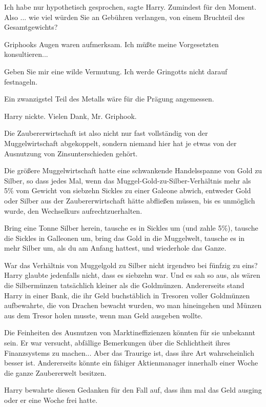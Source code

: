 \glqq Ich habe nur hypothetisch gesprochen\grqq{}, sagte Harry. Zumindest für
den Moment. \glqq Also ... wie viel würden Sie an Gebühren verlangen, von einem
Bruchteil des Gesamtgewichts?\grqq{}

Griphooks Augen waren aufmerksam. \glqq Ich müßte meine Vorgesetzten
konsultieren...\grqq{}

\glqq Geben Sie mir eine wilde Vermutung. Ich werde Gringotts nicht darauf
festnageln.\grqq{}

\glqq Ein zwanzigstel Teil des Metalls wäre für die Prägung angemessen.\grqq{}

Harry nickte. \glqq Vielen Dank, Mr. Griphook.\grqq{}

Die Zaubererwirtschaft ist also nicht nur fast vollständig von der
Muggelwirtschaft abgekoppelt, sondern niemand hier hat je etwas von der
Ausnutzung von Zinsunterschieden gehört.

Die größere Muggelwirtschaft hatte eine schwankende Handelsspanne von Gold zu
Silber, so dass jedes Mal, wenn das Muggel-Gold-zu-Silber-Verhältnis mehr als
5\% vom Gewicht von siebzehn Sickles zu einer Galeone abwich, entweder Gold oder
Silber aus der Zaubererwirtschaft hätte abfließen müssen, bis es unmöglich
wurde, den Wechselkurs aufrechtzuerhalten.

Bring eine Tonne Silber herein, tausche es in Sickles um (und zahle 5\%),
tausche die Sickles in Galleonen um, bring das Gold in die Muggelwelt, tausche
es in mehr Silber um, als du am Anfang hattest, und wiederhole das Ganze.

War das Verhältnis von Muggelgold zu Silber nicht irgendwo bei fünfzig zu eins?
Harry glaubte jedenfalls nicht, dass es siebzehn war. Und es sah so aus, als
wären die Silbermünzen tatsächlich kleiner als die Goldmünzen. Andererseits
stand Harry in einer Bank, die ihr Geld buchstäblich in Tresoren voller
Goldmünzen aufbewahrte, die von Drachen bewacht wurden, wo man hineingehen und
Münzen aus dem Tresor holen musste, wenn man Geld ausgeben wollte.

Die Feinheiten des Ausnutzen von Marktineffizienzen könnten für sie unbekannt
sein. Er war versucht, abfällige Bemerkungen über die Schlichtheit ihres
Finanzsystems zu machen... Aber das Traurige ist, dass ihre Art wahrscheinlich
besser ist. Andererseits könnte ein fähiger Aktienmanager innerhalb einer Woche
die ganze Zaubererwelt besitzen.

Harry bewahrte diesen Gedanken für den Fall auf, dass ihm mal das Geld ausging
oder er eine Woche frei hatte.

